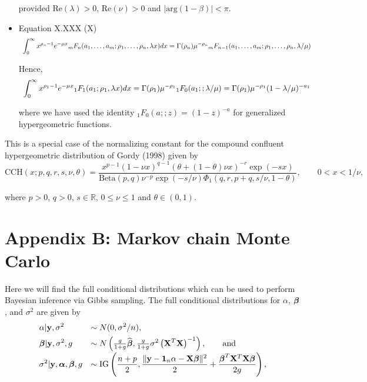 \documentclass{article}[12pt]
\def\bR{{\mathbb R}}
\begin{document}
\begin{itemize}
\noindent provided $\mbox{Re}(\lambda)>0$, $\mbox{Re}(\nu)>0$ and $|\mbox{arg}(1-\beta)|<\pi$.


 

\item Equation X.XXX (X) 
$$
\begin{array}{l}
\displaystyle \int_0^\infty x^{\rho_n - 1}e^{-\mu x} {}_mF_n(a_1,\ldots,a_m;\rho_1,\ldots,\rho_n,\lambda x) dx
=
\Gamma(\rho_n)\mu^{-\rho_n} {}_mF_{n-1}(a_1,\ldots,a_m;\rho_1,\ldots,\rho_n,\lambda/\mu)
\end{array}
$$

\noindent Hence,
$$
\begin{array}{l}
\displaystyle \int_0^\infty x^{\rho_1 - 1}e^{-\mu x} {}_1F_1(a_1;\rho_1,\lambda x) dx
=
\Gamma(\rho_1)\mu^{-\rho_1} {}_1F_{0}(a_1; ;\lambda/\mu)
=
\Gamma(\rho_1)\mu^{-\rho_1} (1 - \lambda/\mu)^{-a_1}
\end{array}
$$

\noindent where we have used the identity ${}_1F_{0}(a; ;z) = (1 - z)^{-a}$ for generalized hypergeometric functions.

\end{itemize}

\noindent This is a special case of the normalizing constant for the compound confluent hypergeometric
distribution of Gordy (1998) given by
$$
\mbox{CCH}(x;p,q,r,s,\nu,\theta) = \frac{ x^{p-1}(1 - \nu x)^{q-1} (\theta + (1-\theta)\nu x)^{-r}\exp(-s x)}{\mbox{Beta}(p,q)\nu^{-p}\exp(-s/\nu)\Phi_1(q,r,p+q,s/\nu,1-\theta)}, \qquad 0< x < 1/\nu, 
$$

\noindent where $p>0$, $q>0$, $s\in\bR$, $0\le \nu\le 1$ and $\theta\in(0,1)$. 



\section*{Appendix B: Markov chain Monte Carlo}

Here we will find the full conditional distributions which can be used to perform Bayesian
inference via Gibbs sampling. The full conditional distributions for $\alpha$, ${\boldsymbol \beta}$, and
$\sigma^2$ are given by
$$
\begin{array}{ll}
\displaystyle \alpha|{\bf y},\sigma^2
& \displaystyle \sim N(0,\sigma^2/n),
\\ [1ex]
\displaystyle {\boldsymbol\beta}|{\bf y},\sigma^2,g 
& \displaystyle \sim N\left(                  
\tfrac{g}{1+g}\widehat{{\boldsymbol \beta}},    
\tfrac{g}{1+g} \sigma^2 \left( {\bf X}^T{\bf X} \right)^{-1} 
\right), \qquad \mbox{and}
\\ [1ex]
\displaystyle \sigma^2|{\bf y},{\boldsymbol \alpha},{\boldsymbol \beta},g
& \displaystyle \sim \mbox{IG}\left( 
\frac{n+p}{2}, \frac{\|{\bf y} - {\bf 1}_n\alpha - {\bf X}{\boldsymbol \beta}\|^2}{2}
+ \frac{{\boldsymbol \beta}^T{\bf X}^T{\bf X}{\boldsymbol \beta}}{2g}
\right), 
\end{array}
$$
\end{document}
